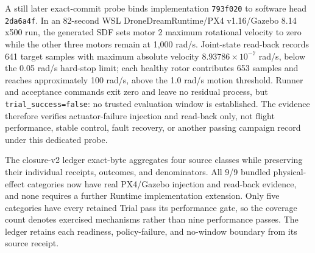 A still later exact-commit probe binds implementation \texttt{793f020} to
software head \texttt{2da6a4f}. In an 82-second WSL
DroneDreamRuntime/PX4 v1.16/Gazebo 8.14 x500 run, the generated SDF sets
motor 2 maximum rotational velocity to zero while the other three motors
remain at 1,000 rad/s. Joint-state read-back records 641 target samples
with maximum absolute velocity $8.93786\times10^{-7}$ rad/s, below the
0.05 rad/s hard-stop limit; each healthy rotor contributes 653 samples
and reaches approximately 100 rad/s, above the 1.0 rad/s motion threshold.
Runner and acceptance commands exit zero and leave no residual process,
but \texttt{trial\_success=false}: no trusted evaluation window is
established. The evidence therefore verifies actuator-failure injection
and read-back only, not flight performance, stable control, fault recovery,
or another passing campaign record under this dedicated probe.

The closure-v2 ledger exact-byte aggregates four source classes while preserving
their individual receipts, outcomes, and denominators. All 9/9 bundled
physical-effect categories now have real PX4/Gazebo injection and read-back
evidence, and none requires a further Runtime implementation extension. Only
five categories have every retained Trial pass its performance gate, so the
coverage count denotes exercised mechanisms rather than nine performance
passes. The ledger retains each readiness, policy-failure, and no-window
boundary from its source receipt.

